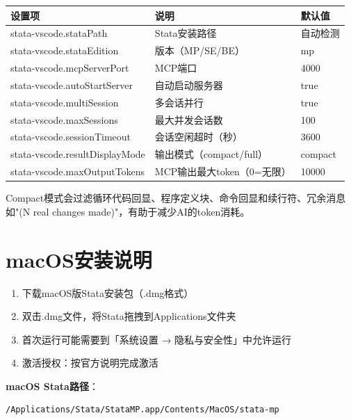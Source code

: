 \begin{table}[H]
\centering
\begin{tabular}{lp{5cm}l}
\toprule
\textbf{设置项} & \textbf{说明} & \textbf{默认值} \\
\midrule
stata-vscode.stataPath & Stata安装路径 & 自动检测 \\
stata-vscode.stataEdition & 版本（MP/SE/BE） & mp \\
stata-vscode.mcpServerPort & MCP端口 & 4000 \\
stata-vscode.autoStartServer & 自动启动服务器 & true \\
stata-vscode.multiSession & 多会话并行 & true \\
stata-vscode.maxSessions & 最大并发会话数 & 100 \\
stata-vscode.sessionTimeout & 会话空闲超时（秒） & 3600 \\
stata-vscode.resultDisplayMode & 输出模式（compact/full） & compact \\
stata-vscode.maxOutputTokens & MCP输出最大token（0=无限） & 10000 \\
\bottomrule
\end{tabular}
\end{table}

\begin{notebox}[Compact模式]
Compact模式会过滤循环代码回显、程序定义块、命令回显和续行符、冗余消息如"(N real changes made)"，有助于减少AI的token消耗。
\end{notebox}

\section{macOS安装说明}

\begin{enumerate}[leftmargin=2em]
  \item 下载macOS版Stata安装包（.dmg格式）
  \item 双击.dmg文件，将Stata拖拽到Applications文件夹
  \item 首次运行可能需要到「系统设置 → 隐私与安全性」中允许运行
  \item 激活授权：按官方说明完成激活
\end{enumerate}

\textbf{macOS Stata路径}：

\begin{lstlisting}[style=shell]
/Applications/Stata/StataMP.app/Contents/MacOS/stata-mp
\end{lstlisting}

